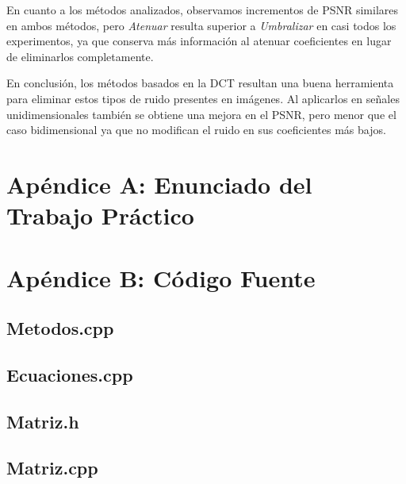 \documentclass[a4paper,10pt,twoside]{article}
\begin{document}
En cuanto a los métodos analizados, observamos incrementos de PSNR similares en ambos métodos, pero \textit{Atenuar} resulta superior a \textit{Umbralizar} en casi todos los experimentos, ya que conserva más información al atenuar coeficientes en lugar de eliminarlos completamente. 

En conclusión, los métodos basados en la DCT resultan una buena herramienta para eliminar estos tipos de ruido presentes en imágenes. Al aplicarlos en señales unidimensionales también se obtiene una mejora en el PSNR, pero menor que el caso bidimensional ya que no modifican el ruido en sus coeficientes más bajos.



\newpage

\section{Apéndice A: Enunciado del Trabajo Práctico}





\newpage

\section{Apéndice B: Código Fuente}

\subsection{Metodos.cpp}


\subsection{Ecuaciones.cpp}


\subsection{Matriz.h}


\subsection{Matriz.cpp}

\end{document}

